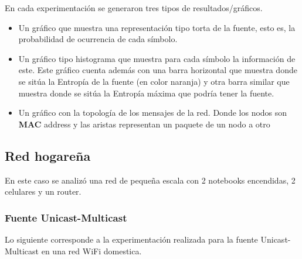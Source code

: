 En cada experimentación se generaron tres tipos de resultados/gráficos.

\begin{itemize}
	\item Un gráfico que muestra una representación tipo torta de la fuente,
	esto es, la probabilidad de ocurrencia de cada símbolo.  \item Un gráfico
	tipo histograma que muestra para cada símbolo la información de este. Este
	gráfico cuenta además con una barra horizontal que muestra donde se sitúa
	la Entropía de la fuente (en color naranja) y otra barra similar que
	muestra donde se sitúa la Entropía máxima que podría tener la fuente.
	\item Un gráfico con la topología de los mensajes de la red. Donde los
	nodos son \textbf{MAC} address y las aristas representan un paquete de un
	nodo a otro
\end{itemize}

\clearpage
\subsection{Red hogareña}

En este caso se analizó una red de pequeña escala con 2 notebooks encendidas,
2 celulares y un router.


\subsubsection{Fuente Unicast-Multicast}

 Lo siguiente corresponde a la experimentación realizada para la fuente
 Unicast-Multicast en una red WiFi domestica.
 
